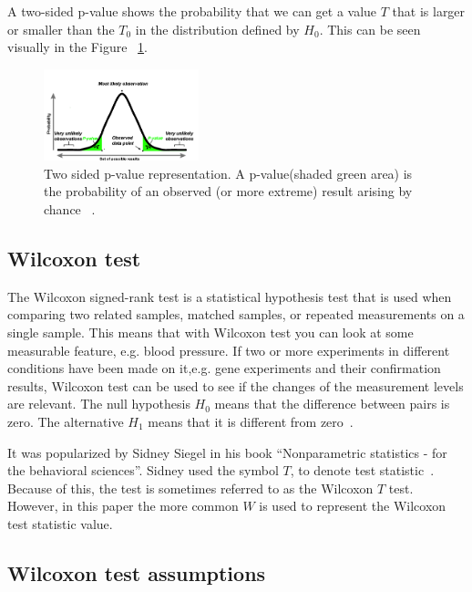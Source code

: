 \documentclass[12pt]{article}
\begin{document}
{A two-sided p-value shows the probability that we can get a value $T$ that is larger or smaller than the $T_0$ in the distribution defined by $H_0$. This can be seen visually in the Figure ~\ref{fig:p_value_two_sided}.

\begin{figure}[H]
  \centering
  \includegraphics[width=0.4\textwidth]{p_value_two_sided}
  \caption{Two sided p-value representation. A p-value(shaded green area) is the probability of an observed (or more extreme) result arising by chance ~\cite{p_value_pic_cite}.}
  \label{fig:p_value_two_sided}
\end{figure}

\subsection{Wilcoxon test}

The Wilcoxon signed-rank test is a statistical hypothesis test that is used when comparing two related samples, matched samples, or repeated measurements on a single sample. This means that with Wilcoxon test you can look at some measurable feature, e.g. blood pressure. If two or more experiments in different conditions have been made on it,e.g. gene experiments and their confirmation results, Wilcoxon test can be used to see if the changes of the measurement levels are relevant. The null hypothesis $H_0$ means that the difference between pairs is zero. The alternative $H_1$ means that it is different from zero~\cite{wilcoxon_original}.

It was popularized by Sidney Siegel in his book ``Nonparametric statistics - for the behavioral sciences''. Sidney used the symbol $T$, to denote test statistic~\cite{siegel_non_parametric}. Because of this, the test is sometimes referred to as the Wilcoxon $T$ test. However, in this paper the more common $W$ is used to represent the Wilcoxon test statistic value.

\subsection{Wilcoxon test assumptions}

}
\end{document}
